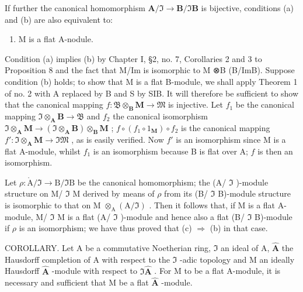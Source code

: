 If further the canonical homomorphism \(\mathbf{A} / \Im \to \mathbf{B} / \Im \mathbf{B}\) is bijective, conditions (a) and (b) are also equivalent to:

\begin{enumerate}
\def\labelenumi{(\alph{enumi})}
\setcounter{enumi}{2}
\tightlist
\item
  M is a flat A-nodule.
\end{enumerate}

Condition (a) implies (b) by Chapter I, §2, no. 7, Corollaries 2 and 3 to Proposition 8 and the fact that M/Im is isomorphic to M ⊗B (B/ImB). Suppose condition (b) holds; to show that M is a flat B-module, we shall apply Theorem 1 of no. 2 with A replaced by B and S by SIB. It will therefore be sufficient to show that the canonical mapping \(f\colon \mathfrak{B} \otimes_{\mathbf{B}} \mathbf{M} \to \mathfrak{M}\) is injective. Let \(f_1\) be the canonical mapping \(\mathfrak{I} \otimes_{\mathbf{A}} \mathbf{B} \to \mathfrak{B}\) and \(f_2\) the canonical isomorphism \(\mathfrak{I} \otimes_{\mathbf{A}} \mathbf{M} \to (\mathfrak{I} \otimes_{\mathbf{A}} \mathbf{B}) \otimes_{\mathbf{B}} \mathbf{M}\) ; \(f \circ (f_1 \circ 1_{\mathbf{M}}) \circ f_2\) is the canonical mapping \(f'\colon \mathfrak{I} \otimes_{\mathbf{A}} \mathbf{M} \to \mathfrak{IM}\) , as is easily verified. Now \(f'\) is an isomorphism since M is a flat A-module, whilst \(f_1\) is an isomorphism because B is flat over A; \(f\) is then an isomorphism.

Let \(\rho: \mathring{\mathrm{A}}/\mathfrak{I} \to \mathrm{B}/\mathfrak{I}\mathrm{B}\) be the canonical homomorphism; the (A/ \(\mathfrak{I}\) )-module structure on M/ \(\mathfrak{I}\) M derived by means of \(\rho\) from its (B/ \(\mathfrak{I}\) B)-module structure is isomorphic to that on M \(\otimes_{\mathrm{A}} (\mathrm{A}/\mathfrak{I})\) . Then it follows that, if M is a flat A-module, M/ \(\mathfrak{I}\) M is a flat (A/ \(\mathfrak{I}\) )-module and hence also a flat (B/ \(\mathfrak{I}\) B)-module if \(\rho\) is an isomorphism; we have thus proved that (c) \(\Rightarrow\) (b) in that case.

COROLLARY. Let A be a commutative Noetherian ring, \(\Im\) an ideal of A, \(\hat{\mathbf{A}}\) the Hausdorff completion of A with respect to the \(\Im\) -adic topology and M an ideally Hausdorff \(\hat{\mathbf{A}}\) -module with respect to \(\Im\hat{\mathbf{A}}\) . For M to be a flat A-module, it is necessary and sufficient that M be a flat \(\hat{\mathbf{A}}\) -module.


